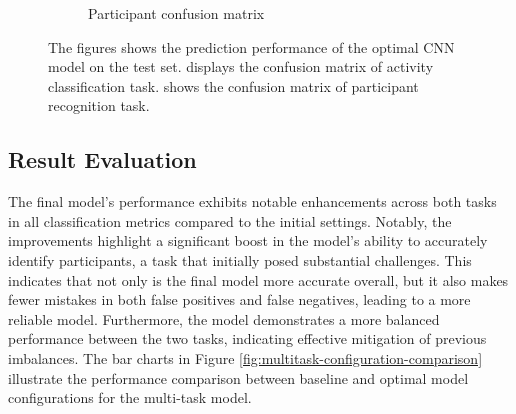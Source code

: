 \documentclass{l4proj}
\begin{document}
\begin{figure}[h]
\begin{subfigure}{0.45\textwidth}
        \caption{Participant confusion matrix}
        \label{fig:multitask-participant-final-test-confusion-matrix}
    \end{subfigure}
  \caption{The figures shows the prediction performance of the optimal CNN model on the test set.  displays the confusion matrix of activity classification task.  shows the confusion matrix of participant recognition task.}
  \label{fig:multitask-final-confusion-matrices}
\end{figure}

\subsection{Result Evaluation}
The final model's performance exhibits notable enhancements across both tasks in all classification metrics compared to the initial settings. Notably, the improvements highlight a significant boost in the model's ability to accurately identify participants, a task that initially posed substantial challenges. This indicates that not only is the final model more accurate overall, but it also makes fewer mistakes in both false positives and false negatives, leading to a more reliable model. Furthermore, the model demonstrates a more balanced performance between the two tasks, indicating effective mitigation of previous imbalances. The bar charts in Figure \ref{fig:multitask-configuration-comparison} illustrate the performance comparison between baseline and optimal model configurations for the multi-task model.
\end{document}
